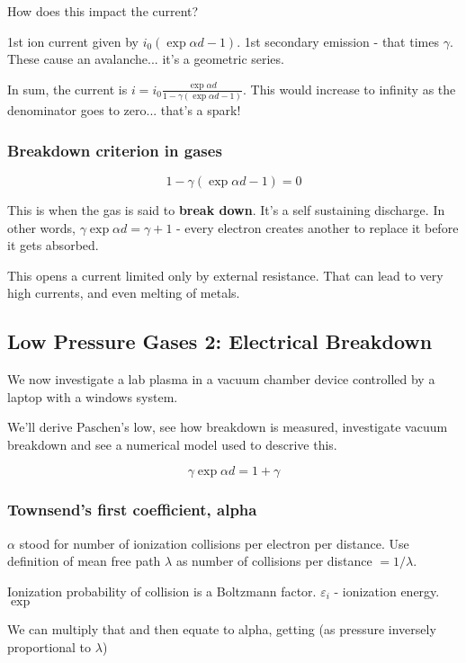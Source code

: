 \documentclass[PlasmaNotes.tex]{subfiles}
\begin{document}
How does this impact the current?

1st ion current given by $i_0(\exp{\alpha d} - 1)$. 1st secondary emission - that times $\gamma$. These cause an avalanche... it's a geometric series.

In sum, the current is $i=i_0 \frac{\exp{\alpha d}}{1-\gamma(\exp{\alpha d} -1)}$. This would increase to infinity as the denominator goes to zero... that's a spark!

\subsubsection{Breakdown criterion in gases}

\[ 1-\gamma(\exp{\alpha d} -1 ) = 0 \]

This is when the gas is said to \textbf{break down}. It's a self sustaining discharge. In other words, $\gamma \exp{\alpha d} = \gamma + 1 $ - every electron creates another to replace it before it gets absorbed.

This opens a current limited only by external resistance. That can lead to very high currents, and even melting of metals.

\subsection{Low Pressure Gases 2: Electrical Breakdown}

We now investigate a lab plasma in a vacuum chamber device controlled by a laptop with a windows system.

We'll derive Paschen's low, see how breakdown is measured, investigate vacuum breakdown and see a numerical model used to descrive this.

\[ \gamma\exp{\alpha d} = 1 + \gamma \]

\subsubsection{Townsend's first coefficient, alpha}


$\alpha$ stood for number of ionization collisions per electron per distance. Use definition of mean free path $\lambda$ as number of collisions per distance $=1/\lambda$.

Ionization probability of collision is a Boltzmann factor. $\varepsilon_i$ - ionization energy. $\exp$

We can multiply that and then equate to alpha, getting (as pressure inversely proportional to $\lambda$)
\end{document}
